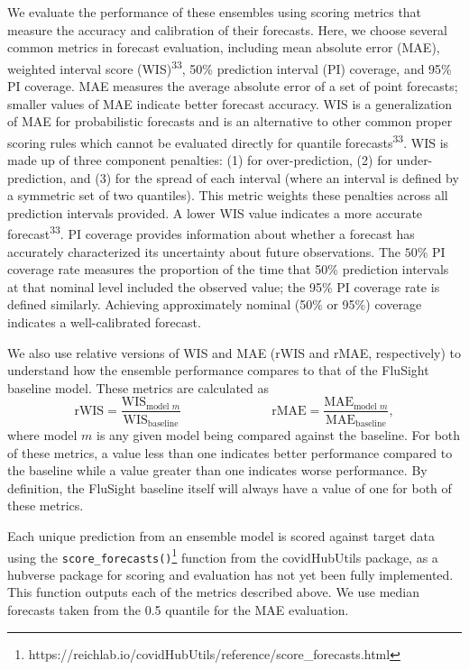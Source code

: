 \documentclass[
  letterpaper,
  DIV=11,
  numbers=noendperiod]{scrartcl}
\begin{document}
We evaluate the performance of these ensembles using scoring metrics
that measure the accuracy and calibration of their forecasts. Here, we
choose several common metrics in forecast evaluation, including mean
absolute error (MAE), weighted interval score (WIS)\textsuperscript{33},
50\% prediction interval (PI) coverage, and 95\% PI coverage. MAE
measures the average absolute error of a set of point forecasts; smaller
values of MAE indicate better forecast accuracy. WIS is a generalization
of MAE for probabilistic forecasts and is an alternative to other common
proper scoring rules which cannot be evaluated directly for quantile
forecasts\textsuperscript{33}. WIS is made up of three component
penalties: (1) for over-prediction, (2) for under-prediction, and (3)
for the spread of each interval (where an interval is defined by a
symmetric set of two quantiles). This metric weights these penalties
across all prediction intervals provided. A lower WIS value indicates a
more accurate forecast\textsuperscript{33}. PI coverage provides
information about whether a forecast has accurately characterized its
uncertainty about future observations. The \(50\)\% PI coverage rate
measures the proportion of the time that 50\% prediction intervals at
that nominal level included the observed value; the 95\% PI coverage
rate is defined similarly. Achieving approximately nominal (50\% or
95\%) coverage indicates a well-calibrated forecast.

We also use relative versions of WIS and MAE (rWIS and rMAE,
respectively) to understand how the ensemble performance compares to
that of the FluSight baseline model. These metrics are calculated as
\[\textrm{rWIS} = \frac{\textrm{WIS}_{\textrm{model }m}}{\textrm{WIS}_{\textrm{baseline}}} \hspace{3cm} \textrm{rMAE} = \frac{\textrm{MAE}_{\textrm{model }m}}{\textrm{MAE}_{\textrm{baseline}}},\]
where model \(m\) is any given model being compared against the
baseline. For both of these metrics, a value less than one indicates
better performance compared to the baseline while a value greater than
one indicates worse performance. By definition, the FluSight baseline
itself will always have a value of one for both of these metrics.

Each unique prediction from an ensemble model is scored against target
data using the \texttt{score\_forecasts()}\footnote{https://reichlab.io/covidHubUtils/reference/score\_forecasts.html}
function from the {covidHubUtils} package, as a hubverse package for
scoring and evaluation has not yet been fully implemented. This function
outputs each of the metrics described above. We use median forecasts
taken from the 0.5 quantile for the MAE evaluation.
\end{document}
